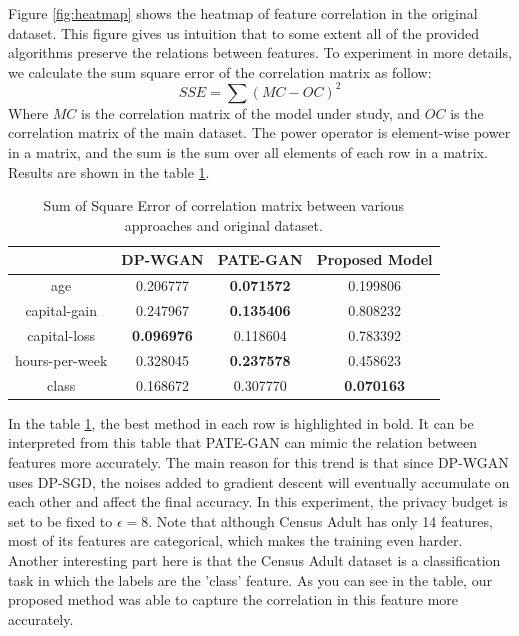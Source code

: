 \documentclass{article}
\begin{document}
Figure \ref{fig:heatmap} shows the heatmap of feature correlation in the original dataset. This figure gives us intuition that to some extent all of the provided algorithms preserve the relations between features. To experiment in more details, we calculate the sum square error of the correlation matrix as follow:
\[ SSE = \sum{(MC - OC) ^ 2} \]
Where $MC$ is the correlation matrix of the model under study, and $OC$ is the correlation matrix of the main dataset. The power operator is element-wise power in a matrix, and the sum is the sum over all elements of each row in a matrix. Results are shown in the table \ref{table:correlation_matrix}.

\begin{table}[ht]
    \centering
    \begin{tabular}{||c | c c c||}
        \hline
        & DP-WGAN & PATE-GAN & Proposed Model \\ [0.5ex] 
        \hline\hline
        age             & 0.206777          & \textbf{0.071572} & 0.199806 \\ 
        capital-gain    & 0.247967          & \textbf{0.135406} & 0.808232 \\
        capital-loss    & \textbf{0.096976} & 0.118604          & 0.783392 \\
        hours-per-week  & 0.328045          & \textbf{0.237578} & 0.458623 \\
        class           & 0.168672          & 0.307770          & \textbf{0.070163} \\ [1ex] 
        \hline
    \end{tabular}
    \caption{Sum of Square Error of correlation matrix between various approaches and original dataset.}
    \label{table:correlation_matrix}
\end{table}

In the table \ref{table:correlation_matrix}, the best method in each row is highlighted in bold. It can be interpreted from this table that PATE-GAN can mimic the relation between features more accurately. The main reason for this trend is that since DP-WGAN uses DP-SGD, the noises added to gradient descent will eventually accumulate on each other and affect the final accuracy. In this experiment, the privacy budget is set to be fixed to $\epsilon = 8$. Note that although Census Adult has only 14 features, most of its features are categorical, which makes the training even harder. Another interesting part here is that the Census Adult dataset is a classification task in which the labels are the 'class' feature. As you can see in the table, our proposed method was able to capture the correlation in this feature more accurately.
\end{document}
